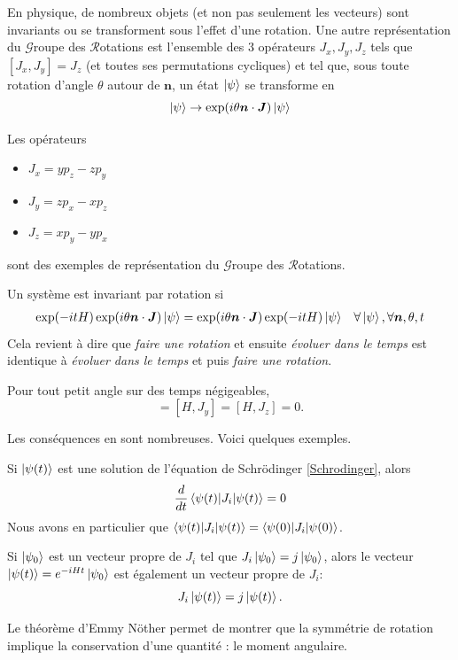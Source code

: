 \documentclass[../notesdecours.tex]{subfiles}
\begin{document}
En physique, de nombreux objets (et non pas seulement les vecteurs) sont invariants ou se transforment sous l'effet d'une rotation. Une autre représentation du $\mathcal{G}$roupe des $\mathcal{R}$otations est l'ensemble des 3 opérateurs $J_x,J_y,J_z$ tels que $[J_x,J_y] = J_z$ (et toutes ses permutations cycliques) et tel que, sous toute rotation d'angle $\theta$ autour de $\bm{n}$, un état $\ket{\psi}$ se transforme en
\begin{equation}
\ket{\psi} \rightarrow \exp(i\theta\bm{n}\cdot\bm{J})\ket{\psi}
\end{equation}

\begin{exemple}Les opérateurs
\begin{itemize}
\item $J_x = yp_z - zp_y$
\item $J_y = zp_x - xp_z$
\item $J_z = xp_y - yp_x$
\end{itemize}
sont des exemples de représentation du $\mathcal{G}$roupe des $\mathcal{R}$otations.
\end{exemple}
Un système est invariant par rotation si
\begin{align}
\exp (-itH) \exp (i\theta \bm{n}\cdot\bm{J})\ket{\psi} &= \exp (i\theta \bm{n}\cdot\bm{J})\exp (-itH) \ket{\psi}			&\forall \ket{\psi},\forall \bm{n},\theta,t
\end{align}
Cela revient à dire que \emph{faire une rotation} et ensuite \emph{évoluer dans le temps} est identique à \emph{évoluer dans le temps} et puis \emph{faire une rotation}.

\begin{Property} 
    Pour tout petit angle sur des temps négigeables,  
    \begin{equation}
        [H,J_x] = [H,J_y] = [H,J_z] = 0.
    \end{equation}
\end{Property}
Les conséquences en sont nombreuses. Voici quelques exemples.
\begin{Property}
    Si $\ket{\psi(t)}$ est une solution de l'équation de Schrödinger \eqref{Schrodinger}, alors 
    \begin{equation}
        \frac{d}{dt}\braket{\psi(t)|J_i|\psi(t)} = 0
    \end{equation}
    Nous avons en particulier que $\braket{\psi(t)|J_i|\psi(t)} = \braket{\psi(0)|J_i|\psi(0)}$.
\end{Property}

\begin{Property}
    Si $\ket{\psi_0}$ est un vecteur propre de $J_i$ tel que $J_i\ket{\psi_0} = j\ket{\psi_0}$, alors le vecteur $\ket{\psi(t)} = e^{-iHt}\ket{\psi_0}$ est également un vecteur propre de $J_i$:
    \begin{equation}
        J_i\ket{\psi(t)} = j\ket{\psi(t)}.
    \end{equation}
\end{Property}
Le théorème d'Emmy Nöther permet de montrer que la symmétrie de rotation implique la conservation d'une quantité : le moment angulaire.
\end{document}
